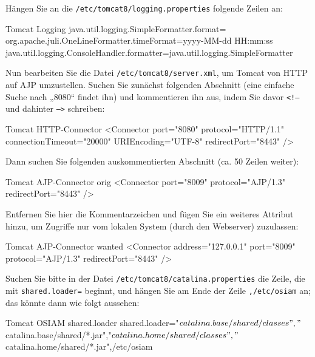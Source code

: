 \documentclass{tarentanleitung}
\begin{document}
\begin{minipage}{\linewidth}
Hängen Sie an die \texttt{/etc/tomcat8/logging.properties} folgende
Zeilen an:

\begin{lstdump}[breaklines=false]{Tomcat Logging}
java.util.logging.SimpleFormatter.format=%
org.apache.juli.OneLineFormatter.timeFormat=yyyy-MM-dd HH:mm:ss
java.util.logging.ConsoleHandler.formatter=java.util.logging.SimpleFormatter
\end{lstdump}
\end{minipage}

\begin{minipage}{\linewidth}
Nun bearbeiten Sie die Datei \texttt{/etc/tomcat8/server.xml}, um Tomcat
von HTTP auf AJP umzustellen. Suchen Sie zunächst folgenden Abschnitt
(eine einfache Suche nach „8080“ findet ihn) und kommentieren ihn aus,
indem Sie davor \texttt{<!--} und dahinter \texttt{-->} schreiben:

\begin{lstdump}[language=XML]{Tomcat HTTP-Connector}
<Connector port="8080" protocol="HTTP/1.1"
           connectionTimeout="20000"
           URIEncoding="UTF-8"
           redirectPort="8443" />
\end{lstdump}
\end{minipage}

\begin{minipage}{\linewidth}
Dann suchen Sie folgenden auskommentierten Abschnitt (ca. 50 Zeilen weiter):

\begin{lstdump}[language=XML]{Tomcat AJP-Connector orig}
<Connector port="8009" protocol="AJP/1.3" redirectPort="8443" />
\end{lstdump}

Entfernen Sie hier die Kommentarzeichen und fügen Sie ein weiteres Attribut
hinzu, um Zugriffe nur vom lokalen System (durch den Webserver) zuzulassen:

\begin{lstdump}[language=XML]{Tomcat AJP-Connector wanted}
<Connector address="127.0.0.1" port="8009" protocol="AJP/1.3" redirectPort="8443" />
\end{lstdump}
\end{minipage}

\begin{minipage}{\linewidth}
Suchen Sie bitte in der Datei \texttt{/etc/tomcat8/catalina.properties}
die Zeile, die mit \texttt{shared.loader=} beginnt, und hängen Sie am
Ende der Zeile \texttt{,/etc/osiam} an; das könnte dann wie folgt aussehen:

\begin{lstdump}{Tomcat OSIAM shared.loader}
shared.loader="${catalina.base}/shared/classes","${catalina.base}/shared/*.jar","${catalina.home}/shared/classes","${catalina.home}/shared/*.jar",/etc/osiam
\end{lstdump}
\end{minipage}
\end{document}

